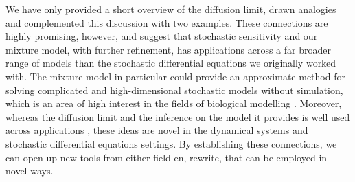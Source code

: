 We have only provided a short overview of the diffusion limit, drawn analogies and complemented this discussion with two examples.
These connections are highly promising, however, and suggest that stochastic sensitivity and our mixture model, with further refinement, has applications across a far broader range of models than the stochastic differential equations we originally worked with.
The mixture model in particular could provide an approximate method for solving complicated and high-dimensional stochastic models without simulation, which is an area of high interest in the fields of biological modelling \citehere.
Moreover, whereas the diffusion limit and the inference on the model it provides is well used across applications \citep[e.g.]{PollettEtAl_2010_ModellingPopulationProcesses,Pollett_1990_ModelInterferenceSearching}, these ideas are novel in the dynamical systems and stochastic differential equations
settings.
By establishing these connections, we can open up new tools from either field en, rewrite, that can be employed in novel ways.




